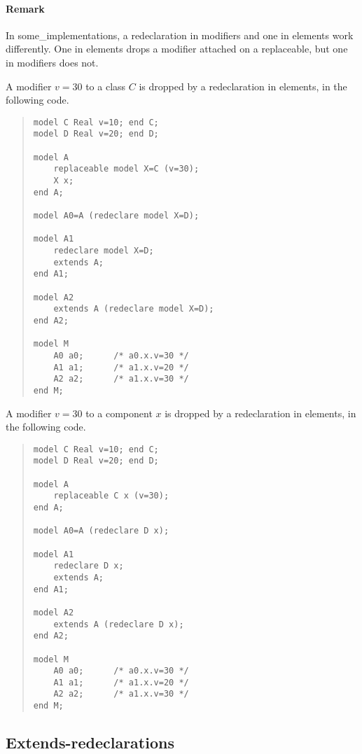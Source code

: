 \documentclass[10pt,b5paper]{article}
\begin{document}
\paragraph {Remark}

In some_implementations, a redeclaration in modifiers and one in
elements work differently.  One in elements drops a modifier attached
on a replaceable, but one in modifiers does not.

A modifier $v=30$ to a class $C$ is dropped by a redeclaration in
elements, in the following code.
\begin{quote}
\begin{lstlisting}[aboveskip=-\baselineskip]
model C Real v=10; end C;
model D Real v=20; end D;

model A
    replaceable model X=C (v=30);
    X x;
end A;

model A0=A (redeclare model X=D);

model A1
    redeclare model X=D;
    extends A;
end A1;

model A2
    extends A (redeclare model X=D);
end A2;

model M
    A0 a0;      /* a0.x.v=30 */
    A1 a1;      /* a1.x.v=20 */
    A2 a2;      /* a1.x.v=30 */
end M;
\end{lstlisting}
\end{quote}

A modifier $v=30$ to a component $x$ is dropped by a redeclaration in
elements, in the following code.
\begin{quote}
\begin{lstlisting}[aboveskip=-\baselineskip]
model C Real v=10; end C;
model D Real v=20; end D;

model A
    replaceable C x (v=30);
end A;

model A0=A (redeclare D x);

model A1
    redeclare D x;
    extends A;
end A1;

model A2
    extends A (redeclare D x);
end A2;

model M
    A0 a0;      /* a0.x.v=30 */
    A1 a1;      /* a1.x.v=20 */
    A2 a2;      /* a1.x.v=30 */
end M;
\end{lstlisting}
\end{quote}


\subsection{Extends-redeclarations}
\end{document}
